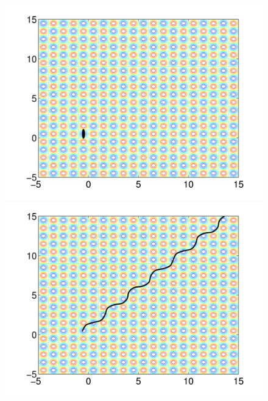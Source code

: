 \documentclass[12pt, oneside]{article}
\begin{document}
\begin{figure}
\begin{minipage}[!htbp]{.5\linewidth}
\includegraphics[width=\textwidth]{./figs/ex1e-e=p1.png}
\subcaption{}
\end{minipage}
\hspace{0.02\linewidth}
\begin{minipage}[!htbp]{.5\linewidth}
\includegraphics[width=\textwidth]{./figs/ex1e-e=1.png}
\subcaption{}
\end{minipage}
\hspace{0.02\linewidth}
\begin{minipage}[!htbp]{.5\linewidth}

\end{minipage}
\end{figure}
\end{document}
